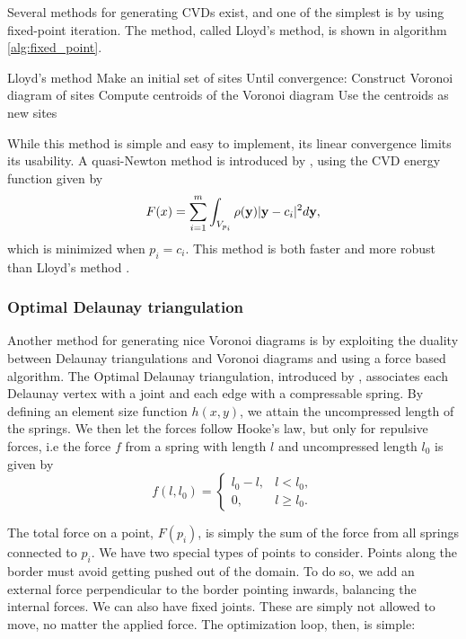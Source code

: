 Several methods for generating CVDs exist, and one of the simplest is by using fixed-point iteration. The method, called Lloyd's method, is shown in algorithm \ref{alg:fixed_point}.

\begin{pseudocode}[label=alg:fixed_point]{Lloyd's method}
    Make an initial set of sites
    Until convergence:
        Construct Voronoi diagram of sites
        Compute centroids of the Voronoi diagram
        Use the centroids as new sites
\end{pseudocode}

While this method is simple and easy to implement, its linear convergence limits its usability. A quasi-Newton method is introduced by \textcite{CVDmethods}, using the CVD energy function given by
\begin{equation}
    F(x) = \sum_{i=1}^m \int_{V_{p_i}} \rho(\mathbf{y}) \lvert\mathbf{y} - c_i\rvert^2 d\mathbf{y},
\end{equation}
which is minimized when $p_i = c_i$. This method is both faster and more robust than Lloyd's method \cite{CVDmethods}.

\subsubsection{Optimal Delaunay triangulation}
\label{sec:optimal-delaunay}
Another method for generating nice Voronoi diagrams is by exploiting the duality between Delaunay triangulations and Voronoi diagrams and using a force based algorithm. The Optimal Delaunay triangulation, introduced by \textcite{Delaunay_force_optimizing}, associates each Delaunay vertex with a joint and each edge with a compressable spring. By defining an element size function $h(x, y)$, we attain the uncompressed length of the springs. We then let the forces follow Hooke's law, but only for repulsive forces, i.e the force $f$ from a spring with length $l$ and uncompressed length $l_0$ is given by
\begin{equation}
    \label{eq:delaunay_force}
    f(l, l_0) = \begin{cases}
        l_0 - l, & l < l_0, \\
        0, & l \ge l_0.
    \end{cases}
\end{equation}

The total force on a point, $F(p_i)$, is simply the sum of the force from all springs connected to $p_i$. We have two special types of points to consider. Points along the border must avoid getting pushed out of the domain. To do so, we add an external force perpendicular to the border pointing inwards, balancing the internal forces. We can also have fixed joints. These are simply not allowed to move, no matter the applied force. The optimization loop, then, is simple:

